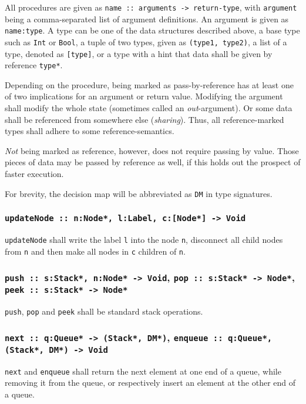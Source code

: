 All procedures are given as \texttt{name ::~arguments -> return-type}, with \texttt{argument} being a comma-separated list of argument definitions.
An argument is given as \texttt{name:type}.
A type can be one of the data structures described above, a base type such as \texttt{Int} or \texttt{Bool}, a tuple of two types, given as \texttt{(type1, type2)}, a list of a type, denoted as \texttt{[type]}, or a type with a hint that data shall be given by reference \texttt{type*}.

Depending on the procedure, being marked as pass-by-reference has at least one of two implications for an argument or return value.
Modifying the argument shall modify the whole state (sometimes called an \emph{out}-argument).
Or some data shall be referenced from somewhere else (\emph{sharing}).
Thus, all reference-marked types shall adhere to some reference-semantics.

\emph{Not} being marked as reference, however, does not require passing by value.
Those pieces of data may be passed by reference as well, if this holds out the prospect of faster execution.

For brevity, the decision map will be abbreviated as \texttt{DM} in type signatures.

\subsubsection{\texttt{updateNode ::~n:Node*, l:Label, c:[Node*] -> Void}}
\label{updateNode}

\texttt{updateNode} shall write the label \texttt{l} into the node \texttt{n}, disconnect all child nodes from \texttt{n} and then make all nodes in \texttt{c} children of \texttt{n}.

\subsubsection{\texttt{push ::~s:Stack*, n:Node* -> Void}, \texttt{pop ::~s:Stack* -> Node*}, \texttt{peek ::~s:Stack* -> Node*}}

\texttt{push}, \texttt{pop} and \texttt{peek} shall be standard stack operations.

\subsubsection{\texttt{next ::~q:Queue* -> (Stack*, DM*)}, \texttt{enqueue ::~q:Queue*, (Stack*, DM*) -> Void}}

\texttt{next} and \texttt{enqueue} shall return the next element at one end of a queue, while removing it from the queue, or respectively insert an element at the other end of a queue.

